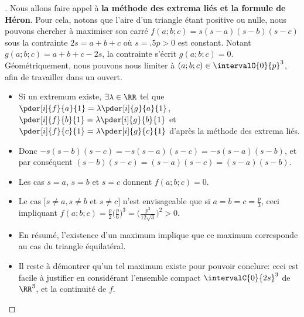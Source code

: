 \begin{proof}[] \label{constrained-extrema}
    Nous allons faire appel à \textbf{la méthode des extrema liés et la formule de Héron}.
    Pour cela, notons que l'aire d'un triangle étant positive ou nulle, nous pouvons chercher à maximiser son carré
    $f(a;b;c) = s(s - a)(s - b)(s - c)$
    sous la contrainte $2s = a + b + c$ où $s = \num{.5} p > 0$ est constant.
    Notant $g(a;b;c) = a + b + c - 2 s$, la contrainte s'écrit $g(a;b;c) = 0$.
    Géométriquement, nous pouvons nous limiter à $(a;b;c) \in \intervalO{0}{p}^3$, afin de travailler dans un ouvert.
    \begin{itemize}
        \item Si un extremum existe,
        $\exists \lambda \in \RR$ tel que
        $\pder[i]{f}{a}{1} = \lambda \pder[i]{g}{a}{1}$,
        $\pder[i]{f}{b}{1} = \lambda \pder[i]{g}{b}{1}$ et
        $\pder[i]{f}{c}{1} = \lambda \pder[i]{g}{c}{1}$
        d'après la méthode des extrema liés.

        \item Donc
        $- s(s - b)(s - c) = - s(s - a)(s - c) = - s(s - a)(s - b)$,
        et par conséquent
        $(s - b)(s - c) = (s - a)(s - c) = (s - a)(s - b)$.

        \item Les cas $s = a$, $s = b$ et $s = c$ donnent $f(a;b;c) = 0$.

        \item Le cas $\big[ s \neq a, s \neq b \text{ et } s \neq c \big]$ n'est envisageable que si $a = b = c = \frac{p}{3}$, ceci impliquant $f(a;b;c) = \frac{p}{2} \big( \frac{p}{6} \big)^3 = \big( \frac{p^2}{12 \sqrt{3}} \big)^2 > 0$.

        \item En résumé, l'existence d'un maximum implique que ce maximum corresponde au cas du triangle équilatéral.

        \item Il reste à démontrer qu'un tel maximum existe pour pouvoir conclure: ceci est facile à justifier en considérant l'ensemble compact $\intervalC{0}{2s}^3$ de $\RR^3$, et la continuité de $f$.
    \end{itemize}

    \null\vspace{-6ex}
\end{proof}
